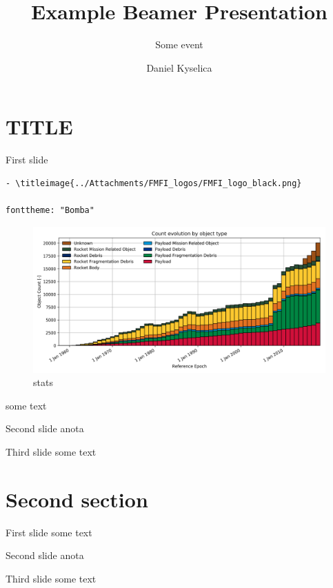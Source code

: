 \documentclass[
  ignorenonframetext,
]{beamer}
\institute{Faculty of Mathematics, Physics and Informatics, Comenius University}
\title{Example Beamer Presentation}
\subtitle{Some event}
\author{Daniel Kyselica}
\date{}
\begin{document}
\frame{\titlepage}

\section{TITLE}\label{title}

\begin{frame}[fragile]{First slide}
\label{first-slide}
\begin{verbatim}
- \titleimage{../Attachments/FMFI_logos/FMFI_logo_black.png}

fonttheme: "Bomba"
\end{verbatim}

\begin{figure}
\centering
\includegraphics[width=0.5\linewidth,height=\textheight,keepaspectratio]{../templates/debris_stats.png}
\caption{stats}
\end{figure}

some text
\end{frame}

\begin{frame}{Second slide}
\label{second-slide}
anota
\end{frame}

\begin{frame}{Third slide}
\label{third-slide}
some text
\end{frame}

\section{Second section}\label{second-section}

\begin{frame}{First slide}
\label{first-slide-1}
some text
\end{frame}

\begin{frame}{Second slide}
\label{second-slide-1}
anota
\end{frame}

\begin{frame}{Third slide}
\label{third-slide-1}
some text
\end{frame}
\end{document}
